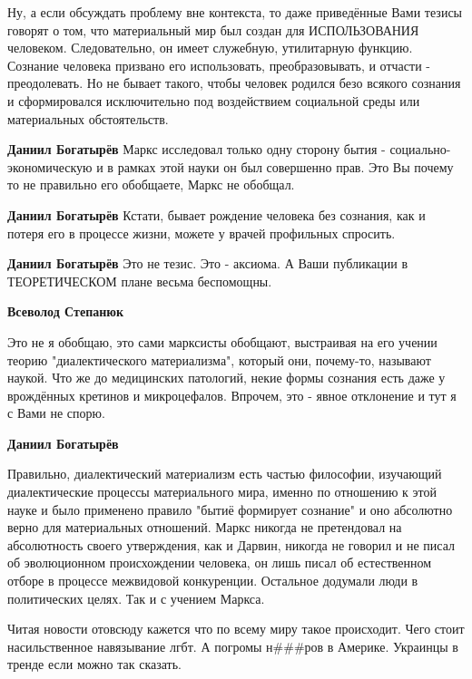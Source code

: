 \begin{itemize}
\begin{itemize}
Ну, а если обсуждать проблему вне контекста, то даже приведённые Вами тезисы
говорят о том, что материальный мир был создан для ИСПОЛЬЗОВАНИЯ человеком.
Следовательно, он имеет служебную, утилитарную функцию. Сознание человека
призвано его использовать, преобразовывать, и отчасти - преодолевать. Но не
бывает такого, чтобы человек родился безо всякого сознания и сформировался
исключительно под воздействием социальной среды или материальных обстоятельств.


\textbf{Даниил Богатырёв} Маркс исследовал только одну сторону бытия - социально-экономическую и в рамках этой науки он был совершенно прав. Это Вы почему то не правильно его обобщаете, Маркс не обобщал.

\textbf{Даниил Богатырёв} Кстати, бывает рождение человека без сознания, как и потеря его в процессе жизни, можете у врачей профильных спросить.

\textbf{Даниил Богатырёв} Это не тезис. Это - аксиома. А Ваши публикации в ТЕОРЕТИЧЕСКОМ плане весьма беспомощны.

\textbf{Всеволод Степанюк} 

Это не я обобщаю, это сами марксисты обобщают, выстраивая на его учении теорию
"диалектического материализма", который они, почему-то, называют наукой. Что же
до медицинских патологий, некие формы сознания есть даже у врождённых кретинов
и микроцефалов. Впрочем, это - явное отклонение и тут я с Вами не спорю.

\textbf{Даниил Богатырёв} 

Правильно, диалектический материализм есть частью философии, изучающий
диалектические процессы материального мира, именно по отношению к этой науке и
было применено правило "бытиё формирует сознание" и оно абсолютно верно для
материальных отношений. Маркс никогда не претендовал на абсолютность своего
утверждения, как и Дарвин, никогда не говорил и не писал об эволюционном
происхождении человека, он лишь писал об естественном отборе в процессе
межвидовой конкуренции. Остальное додумали люди в политических целях. Так и с
учением Маркса.

\end{itemize} %


Читая новости отовсюду кажется что по всему миру такое происходит. Чего стоит
насильственное навязывание лгбт. А погромы н\#\#\#ров в Америке. Украинцы в тренде
если можно так сказать.


\end{itemize}
